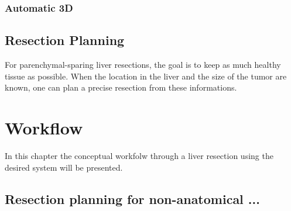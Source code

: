 \subsubsection{Automatic 3D}

\subsection{Resection Planning}
For parenchymal-sparing liver resections, the goal is to keep as much healthy tissue as
possible. When the location in the liver and the size of the tumor are known, one can plan a
precise resection from these informations.

\section{Workflow}
In this chapter the conceptual workfolw through a liver resection using the
desired system will be presented.
\subsection{Resection planning for non-anatomical ...}

